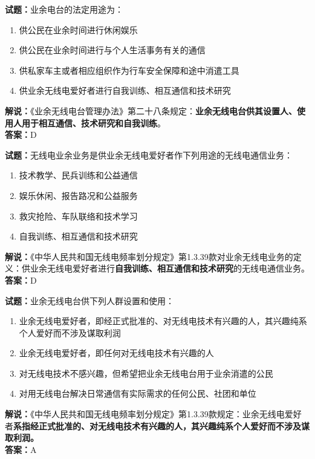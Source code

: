 \documentclass{ctexbook}
\begin{document}
\vspace{\baselineskip}

\noindent\textbf{试题：}业余电台的法定用途为：
\begin{enumerate}[leftmargin=3em]
  \item 供公民在业余时间进行休闲娱乐
  \item 供公民在业余时间进行与个人生活事务有关的通信
  \item 供私家车主或者相应组织作为行车安全保障和途中消遣工具
  \item 供业余无线电爱好者进行自我训练、相互通信和技术研究
\end{enumerate}
\noindent\textbf{解说：}《业余无线电台管理办法》第二十八条规定：\textbf{业余无线电台供其设置人、使用人用于相互通信、技术研究和自我训练}。\\\noindent\textbf{答案：}D

\vspace{\baselineskip}

\noindent\textbf{试题：}无线电业余业务是供业余无线电爱好者作下列用途的无线电通信业务：
\begin{enumerate}[leftmargin=3em]
  \item 技术教学、民兵训练和公益通信
  \item 娱乐休闲、报告路况和公益服务
  \item 救灾抢险、车队联络和技术学习
  \item 自我训练、相互通信和技术研究
\end{enumerate}
\noindent\textbf{解说：}《中华人民共和国无线电频率划分规定》第1.3.39款对业余无线电业务的定义：供业余无线电爱好者进行\textbf{自我训练、相互通信和技术研究}的无线电通信业务。\\\noindent\textbf{答案：}D

\vspace{\baselineskip}

\noindent\textbf{试题：}业余无线电台供下列人群设置和使用：
\begin{enumerate}[leftmargin=3em]
  \item 业余无线电爱好者，即经正式批准的、对无线电技术有兴趣的人，其兴趣纯系个人爱好而不涉及谋取利润
  \item 业余无线电爱好者，即任何对无线电技术有兴趣的人
  \item 对无线电技术不感兴趣，但希望把业余无线电台用于业余消遣的公民
  \item 对用无线电台解决日常通信有实际需求的任何公民、社团和单位
\end{enumerate}
\noindent\textbf{解说：}《中华人民共和国无线电频率划分规定》第1.3.39款规定：业余无线电爱好者\textbf{系指经正式批准的、对无线电技术有兴趣的人，其兴趣纯系个人爱好而不涉及谋取利润。}\\\noindent\textbf{答案：}A
\end{document}
